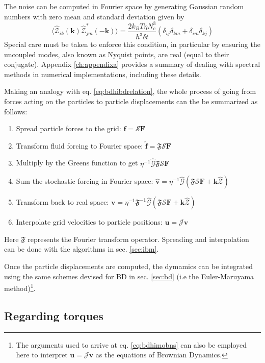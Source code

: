 \documentclass[ twoside,openright,titlepage,numbers=noenddot,%
headinclude,footinclude,cleardoublepage=empty,abstract=on,
BCOR=5mm,paper=a4,fontsize=11pt, dvipsnames
]{scrreprt}
\renewcommand{\vec}[1]{\bm{#1}}
\newcommand{\tens}[1]{\bm{\mathcal{#1}}}
\newcommand{\oper}[1]{\mathcal{#1}}
\newcommand{\dt}{\delta t}
\newcommand{\kT}{k_B T}
\newcommand{\fou}[1]{\widehat{#1}}
\newcommand{\pvel}{u}
\newcommand{\fvel}{v}
\begin{document}
The noise can be computed in Fourier space by generating Gaussian random numbers with zero mean and standard deviation given by
\begin{equation}
  \langle \fou{\mathcal{Z}}_{ik}(\vec{k})\fou{\mathcal{Z}}^*_{jm} (-\vec{k})\rangle = \frac{2\kT\eta N_c^3}{ h^3 \dt}(\delta_{ij}\delta_{km} + \delta_{im}\delta_{kj})
\end{equation}
Special care must be taken to enforce this condition, in particular by ensuring the uncoupled modes, also known as Nyquist points, are real (equal to their conjugate). Appendix \ref{ch:appendixa} provides a summary of dealing with spectral methods in numerical implementations, including these details.

Making an analogy with eq. \eqref{eq:bdhibdrelation}, the whole process of going from forces acting on the particles to particle displacements can the be summarized as follows:

\begin{enumerate}
\item Spread particle forces to the grid: $\vec{f} = \oper{S}\vec{F}$
\item Transform fluid forcing to Fourier space: $\fou{\vec{f}} = \mathfrak{F}\oper{S}\vec{F}$
\item Multiply by the Greens function to get $\eta^{-1}\fou{\tens{G}}\mathfrak{F}\oper{S}\vec{F}$
\item Sum the stochastic forcing in Fourier space: $\fou{\vec{\fvel}} = \eta^{-1}\fou{\tens{G}}(\mathfrak{F}\oper{S}\vec{F} + \vec{k}\fou{\mathcal{Z}})$
\item Transform back to real space: $\vec{\fvel} = \eta^{-1}\mathfrak{F}^{-1}\fou{\tens{G}}(\mathfrak{F}\oper{S}\vec{F} + \vec{k}\fou{\mathcal{Z}})$
\item Interpolate grid velocities to particle positions: $\vec{\pvel} = \oper{J}\vec{\fvel}$
\end{enumerate}
Here $\mathfrak{F}$ represents the Fourier transform operator.
Spreading and interpolation can be done with the algorithms in sec. \ref{sec:ibm}.

Once the particle displacements are computed, the dymamics can be integrated using the same schemes devised for \gls{BD} in sec. \ref{sec:bd} (i.e the Euler-Maruyama method)\footnote{The arguments used to arrive at eq. \eqref{eq:bdhimobns} can also be employed here to interpret $\vec{\pvel}=\oper{J}\vec{\fvel}$ as the equations of Brownian Dynamics.}.

\subsection*{Regarding torques}
\end{document}
